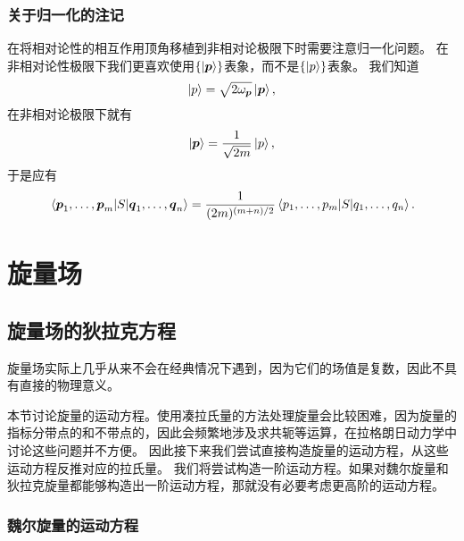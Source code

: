 \documentclass[hyperref, UTF8, a4paper]{ctexart}
\begin{document}
\subsubsection{关于归一化的注记}

在将相对论性的相互作用顶角移植到非相对论极限下时需要注意归一化问题。
在非相对论性极限下我们更喜欢使用$\{\ket{\vb*{p}}\}$表象，而不是$\{\ket{p}\}$表象。
我们知道
\[
    \ket{p} = \sqrt{2 \omega_{\vb*{p}}} \ket{\vb*{p}},
\]
在非相对论极限下就有
\begin{equation}
    \ket{\vb*{p}} = \frac{1}{\sqrt{2m}} \ket{p},
\end{equation}
于是应有
\begin{equation}
    \mel*{\vb*{p}_1, \ldots, \vb*{p}_m}{S}{\vb*{q}_1, \ldots, \vb*{q}_n} = \frac{1}{(2m)^{(m+n)/2}} \mel*{p_1, \ldots, p_m}{S}{q_1, \ldots, q_n}.
\end{equation}

\section{旋量场}

\subsection{旋量场的狄拉克方程}

旋量场实际上几乎从来不会在经典情况下遇到，因为它们的场值是复数，因此不具有直接的物理意义。

本节讨论旋量的运动方程。使用凑拉氏量的方法处理旋量会比较困难，因为旋量的指标分带点的和不带点的，因此会频繁地涉及求共轭等运算，在拉格朗日动力学中讨论这些问题并不方便。
因此接下来我们尝试直接构造旋量的运动方程，从这些运动方程反推对应的拉氏量。
我们将尝试构造一阶运动方程。如果对魏尔旋量和狄拉克旋量都能够构造出一阶运动方程，那就没有必要考虑更高阶的运动方程。

\subsubsection{魏尔旋量的运动方程} 
\end{document}
